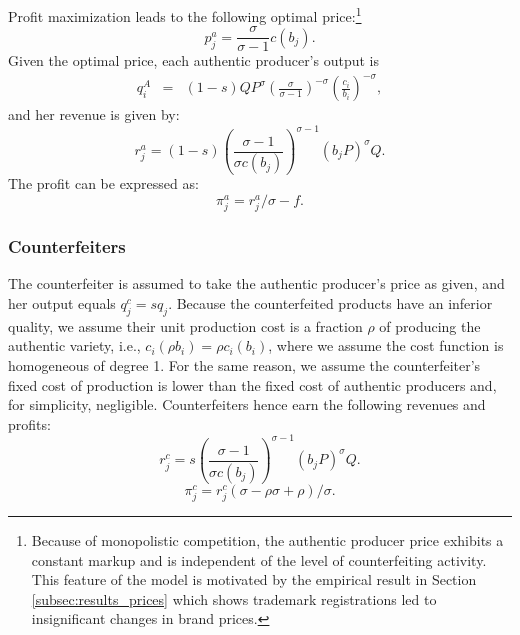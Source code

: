 \documentclass[12pt]{article}
\begin{document}
Profit maximization leads to the following optimal price:\footnote{Because of monopolistic competition, the authentic producer price exhibits a constant markup and is independent of the level of counterfeiting activity. This feature of the model is motivated by the empirical result in Section \ref{subsec:results_prices} which shows trademark registrations led to insignificant changes in brand prices.} 
\begin{equation}
p_{j}^{a}=\frac{\sigma}{\sigma-1}c\left(b_{j}\right).
\end{equation}
Given the optimal price, each authentic producer's output is
\begin{eqnarray} \label{eq:output_authentic}
   q_i^A&=& (1-s)Q P^{\sigma} \left(\frac{\sigma}{\sigma - 1} \right)^{-\sigma} \left( \frac{c_i}{b_i} \right)^{-\sigma},
\end{eqnarray}
and her revenue is given by:
\begin{equation}
r_{j}^{a}=(1-s)\left(\frac{\sigma-1}{\sigma c(b_{j})}\right)^{\sigma-1}\left(b_{j}P\right)^{\sigma}Q.
\end{equation}
The profit can be expressed as: 
\begin{equation}
\pi_{j}^{a}=r_{j}^{a}/\sigma-f.
\end{equation}


\subsubsection{Counterfeiters}

The counterfeiter is assumed to take the authentic producer's price as given, and her output equals $q_j^c=sq_j$. Because the counterfeited products have an inferior quality, we assume their unit production cost is a fraction $\rho $ of producing the authentic variety, i.e., $c_i(\rho b_i) = \rho c_i(b_i)$, where we assume the cost function is homogeneous of degree 1. For the same reason, we assume the counterfeiter's fixed cost of production is lower than the fixed cost of authentic producers and, for simplicity, negligible. Counterfeiters
hence earn the following revenues and profits:
\begin{equation}
r_{j}^{c}=s\left(\frac{\sigma-1}{\sigma c(b_{j})}\right)^{\sigma-1}\left(b_{j}P\right)^{\sigma}Q.
\end{equation}
\begin{equation}
\pi_{j}^{c}=r_{j}^{c}\left(\sigma-\rho\sigma+\rho\right)/\sigma.
\end{equation}
\end{document}
